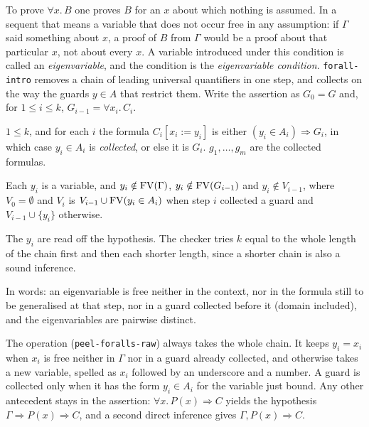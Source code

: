 To prove $\forall x.\, B$ one proves $B$ for an $x$ about which nothing
is assumed.  In a sequent that means a variable that does not occur free
in any assumption: if $\Gamma$ said something about $x$, a proof of $B$
from $\Gamma$ would be a proof about that particular $x$, not about every
$x$.  A variable introduced under this condition is called an
\emph{eigenvariable}, and the condition is the \emph{eigenvariable
condition}.  \texttt{forall-intro} removes a chain of leading universal
quantifiers in one step, and collects on the way the guards $y \in A$
that restrict them.  Write the assertion as $G_0 = G$ and, for
$1 \leq i \leq k$, $G_{i-1} = \forall x_i.\, C_i$.
\label{kop:forall-intro}%
\begin{VNBcond}
\item[Chain] $1 \leq k$, and for each $i$ the formula $C_i[x_i{:=}y_i]$
  is either $(y_i \in A_i) \Rightarrow G_i$, in which case $y_i \in A_i$
  is \emph{collected}, or else it is $G_i$.  $g_1, \ldots, g_m$ are the
  collected formulas.
\item[Eigenvariable] Each $y_i$ is a variable, and
  $y_i \notin \mathrm{FV}(\Gamma)$, $y_i \notin \mathrm{FV}(G_{i-1})$ and
  $y_i \notin V_{i-1}$, where $V_0 = \emptyset$ and $V_i$ is
  $V_{i-1} \cup \mathrm{FV}(y_i \in A_i)$ when step $i$ collected a guard and
  $V_{i-1} \cup \{y_i\}$ otherwise.
\item[Matching] The $y_i$ are read off the hypothesis.  The checker
  tries $k$ equal to the whole length of the chain first and then each
  shorter length, since a shorter chain is also a sound inference.
\end{VNBcond}
In words: an eigenvariable is free neither in the context, nor in the
formula still to be generalised at that step, nor in a guard collected
before it (domain included), and the eigenvariables are pairwise
distinct.

The operation (\texttt{peel-foralls-raw}) always takes the whole chain.
It keeps $y_i = x_i$ when $x_i$ is free neither in $\Gamma$ nor in a
guard already collected, and otherwise takes a new variable, spelled as
$x_i$ followed by an underscore and a number.
A guard is collected only when it has the form $y_i \in A_i$ for the
variable just bound.  Any other antecedent stays in the assertion:
$\forall x.\, P(x) \Rightarrow C$ yields the hypothesis
$\Gamma \Longrightarrow P(x) \Rightarrow C$, and a second direct inference
gives $\Gamma, P(x) \Longrightarrow C$.

